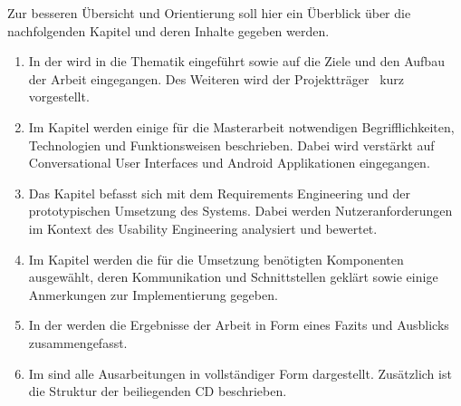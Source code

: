 Zur besseren Übersicht und Orientierung soll hier ein Überblick über die nachfolgenden Kapitel und deren Inhalte gegeben werden. 

\begin{enumerate}
  \item In der  wird in die Thematik eingeführt sowie auf die Ziele und den Aufbau der Arbeit eingegangen. Des Weiteren wird der Projektträger  \adorsys \ kurz vorgestellt. 
  
  \item Im Kapitel  werden einige für die Masterarbeit notwendigen Begrifflichkeiten, Technologien und Funktionsweisen beschrieben. Dabei wird verstärkt auf Conversational User Interfaces und Android Applikationen eingegangen. 
  
  \item Das Kapitel  befasst sich mit dem Requirements Engineering und der prototypischen Umsetzung des Systems. Dabei werden Nutzeranforderungen im Kontext des Usability Engineering analysiert und bewertet. 
  
  \item Im Kapitel  werden die für die Umsetzung benötigten Komponenten ausgewählt, deren Kommunikation und Schnittstellen geklärt sowie einige Anmerkungen zur Implementierung gegeben.
  
  \item In der  werden die Ergebnisse der Arbeit in Form eines Fazits und Ausblicks zusammengefasst.
  
  \item Im  sind alle Ausarbeitungen in vollständiger Form dargestellt. Zusätzlich ist die Struktur der beiliegenden CD beschrieben.
\end{enumerate}
